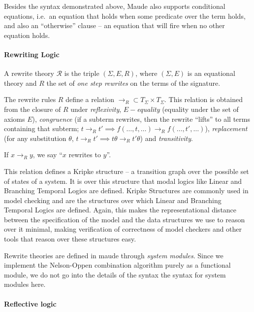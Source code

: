 \documentclass[]{article}
\let\oldparagraph\paragraph
\renewcommand{\paragraph}[1]{\oldparagraph{#1}\mbox{}}
\newcommand \rewrite  {\longrightarrow_R}
\newcommand \rewrites {\longrightarrow_R}
\newcommand \terms    {T_{\Sigma}}
\begin{document}
Besides the syntax demonstrated above, Maude also supports conditional
equations, i.e.~an equation that holds when some predicate over the term
holds, and also an ``otherwise'' clause -- an equation that will fire
when no other equation holds.

\hypertarget{rewriting-logic}{%
\paragraph{Rewriting Logic}\label{rewriting-logic}}

A rewrite theory \(\mathcal R\) is the triple \((\Sigma, E, R)\), where
\((\Sigma, E)\) is an equational theory and \(R\) the set of \emph{one
step rewrites} on the terms of the signature.

The rewrite rules \(R\) define a relation
\(\rewrite \subset \terms\times\terms\). This relation is obtained from
the closure of \(R\) under \emph{reflexivity}, \emph{\(E-\)equality}
(equality under the set of axioms \(E\)), \emph{congruence} (if a
subterm rewrites, then the rewrite ``lifts'' to all terms containing
that subterm;
\(t \rewrite t' \implies f(\ldots, t, \ldots) \rewrite f(\ldots, t', \ldots)\)),
\emph{replacement} (for any substitution \(\theta\),
\(t \rewrite t' \implies t\theta \rewrite t'\theta\)) and
\emph{transitivity}.

If \(x \rewrites y\), we say ``\(x\) rewrites to \(y\)''.

This relation defines a Kripke structure -- a transition graph over the
possible set of states of a system. It is over this structure that modal
logics like Linear and Branching Temporal Logics are defined. Kripke
Structures are commonly used in model checking and are the structures
over which Linear and Branching Temporal Logics are defined. Again, this
makes the representational distance between the specification of the
model and the data structures we use to reason over it minimal, making
verification of correctness of model checkers and other tools that
reason over these structures easy.

Rewrite theories are defined in maude through \emph{system modules}.
Since we implement the Nelson-Oppen combination algorithm purely as a
functional module, we do not go into the details of the syntax the
syntax for system modules here.

\hypertarget{reflective-logic}{%
\paragraph{Reflective logic}\label{reflective-logic}}
\end{document}
